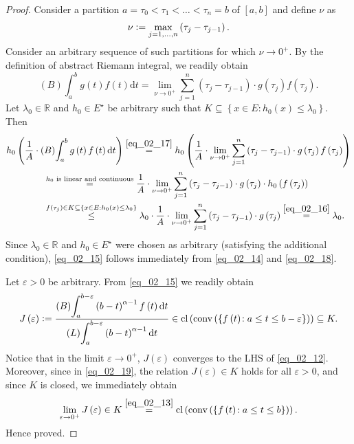\documentclass[reqno]{amsart}
\numberwithin{equation}{section}
\theoremstyle{definition}
\theoremstyle{remark}
\newcommand{\Bint}[3]{\br{B}\!\displaystyle\int_{#1}^{#2}{#3}}
\newcommand{\br}[1]{\left(#1\right)}
\newcommand{\cbr}[1]{\left\{#1\right\}}
\newcommand{\cl}[1]{\clOperator\br{#1}}
\newcommand{\conv}[1]{\convOperator\br{#1}}
\newcommand{\defeq}{\vcentcolon=}
\newcommand{\dt}{\mathrm{d}t}
\newcommand{\eps}{\varepsilon}
\newcommand{\eqText}[1]{\stackrel{#1}{=}}
\newcommand{\leqText}[1]{\stackrel{#1}{\leq}}
\newcommand{\Lint}[3]{\br{L}\!\displaystyle\int_{#1}^{#2}{#3}}
\newcommand{\R}{\mathbb{R}}
\newcommand{\sbr}[1]{\left[#1\right]}
\newcommand{\sE}{E^{\star}}
\newcommand{\st}{\!:}
\DeclareMathOperator{\clOperator}{cl}
\DeclareMathOperator{\convOperator}{conv}
\begin{document}
\begin{proof}
	Consider a partition $a=\tau_0<\tau_1<\dots<\tau_n=b$ of $\sbr{a,b}$ and define $\nu$ as
	\begin{equation*}
		\nu\defeq\max_{j=1,\dots,n}\br{\tau_j-\tau_{j-1}}.
	\end{equation*}
	Consider an arbitrary sequence of such partitions for which $\nu\rightarrow0^+$. By the definition of abstract Riemann integral, we readily obtain
	\begin{equation}\label{eq_02_17}
		\Bint{a}{b}{g\br{t}f\br{t}\dt}=\lim_{\nu\rightarrow0^+}\sum_{j=1}^n\br{\tau_j-\tau_{j-1}}\cdot{g}\br{\tau_j}f\br{\tau_j}.
	\end{equation}
	Let $\lambda_0\in\R$ and $h_0\in\sE$ be arbitrary such that $K\subseteq\cbr{x\in{E}\st{h}_0\br{x}\leq\lambda_0}$. Then
	\begin{equation}\label{eq_02_18}
		\begin{aligned}
			&h_0\br{\frac{1}{A}\cdot\Bint{a}{b}{g\br{t}f\br{t}\dt}}\eqText{\eqref{eq_02_17}}h_0\br{\frac{1}{A}\cdot\lim_{\nu\rightarrow0^+}\sum_{j=1}^n\br{\tau_j-\tau_{j-1}}\cdot{g}\br{\tau_j}f\br{\tau_j}}\\
			&\qquad\qquad\eqText{h_0\text{ is linear and continuous}}\frac{1}{A}\cdot\lim_{\nu\rightarrow0^+}\sum_{j=1}^n\br{\tau_j-\tau_{j-1}}\cdot{g}\br{\tau_j}\cdot{h}_0\br{f\br{\tau_j}}\\
			&\qquad\qquad\leqText{f\br{\tau_j}\in{K}\subseteq\cbr{x\in{E}\,\st{h}_0\br{x}\leq\lambda_0}}\lambda_0\cdot\frac{1}{A}\cdot\lim_{\nu\rightarrow0^+}\sum_{j=1}^n\br{\tau_j-\tau_{j-1}}\cdot{g}\br{\tau_j}\eqText{\eqref{eq_02_16}}\lambda_0.
		\end{aligned}
	\end{equation}
	Since $\lambda_0\in\R$ and $h_0\in\sE$ were chosen as arbitrary (satisfying the additional condition), \eqref{eq_02_15} follows immediately from \eqref{eq_02_14} and \eqref{eq_02_18}.
	
	Let $\eps>0$ be arbitrary. From \eqref{eq_02_15} we readily obtain
	\begin{equation}\label{eq_02_19}
		J\br{\eps}\defeq\frac{\Bint{a}{b-\eps}{\br{b-t}^{\alpha-1}f\br{t}\dt}}{\Lint{a}{b-\eps}{\br{b-t}^{\alpha-1}\dt}}\in\cl{\conv{\cbr{f\br{t}\st{a}\leq{t}\leq{b}-\eps}}}\subseteq{K}.
	\end{equation}
	Notice that in the limit $\eps\rightarrow0^+$, $J\br{\eps}$ converges to the LHS of \eqref{eq_02_12}. Moreover, since in \eqref{eq_02_19}, the relation $J\br{\eps}\in{K}$ holds for all $\eps>0$, and since $K$ is closed, we immediately obtain
	\begin{equation*}
		\lim_{\eps\rightarrow0^+}J\br{\eps}\in{K}\eqText{\eqref{eq_02_13}}\cl{\conv{\cbr{f\br{t}\st{a}\leq{t}\leq{b}}}}.
	\end{equation*}
	Hence proved.
	\end{proof}
	
\end{document}
